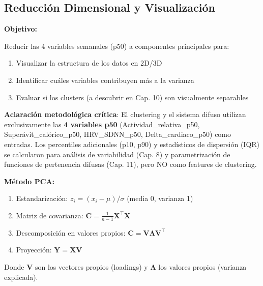 \documentclass[12pt,letterpaper,twoside]{report}
\newcommand{\mat}[1]{\mathbf{#1}}
\begin{document}
\subsection{Reducción Dimensional y Visualización}

\begin{hipotesisbox}
\textbf{Objetivo:}

Reducir las 4 variables semanales (p50) a componentes principales para:
\begin{enumerate}[noitemsep]
    \item Visualizar la estructura de los datos en 2D/3D
    \item Identificar cuáles variables contribuyen más a la varianza
    \item Evaluar si los clusters (a descubrir en Cap. 10) son visualmente separables
\end{enumerate}

\textbf{Aclaración metodológica crítica}: El clustering y el sistema difuso utilizan exclusivamente las \textbf{4 variables p50} (Actividad\_relativa\_p50, Superávit\_calórico\_p50, HRV\_SDNN\_p50, Delta\_cardiaco\_p50) como entradas. Los percentiles adicionales (p10, p90) y estadísticos de dispersión (IQR) se calcularon para análisis de variabilidad (Cap. 8) y parametrización de funciones de pertenencia difusas (Cap. 11), pero NO como features de clustering.
\end{hipotesisbox}

\begin{estadisticobox}
\textbf{Método PCA:}

\begin{enumerate}[noitemsep]
    \item Estandarización: $z_i = (x_i - \mu) / \sigma$ (media 0, varianza 1)
    \item Matriz de covarianza: $\mat{C} = \frac{1}{n-1}\mat{X}^\top\mat{X}$
    \item Descomposición en valores propios: $\mat{C} = \mat{V}\mat{\Lambda}\mat{V}^\top$
    \item Proyección: $\mat{Y} = \mat{X}\mat{V}$
\end{enumerate}

Donde $\mat{V}$ son los vectores propios (loadings) y $\mat{\Lambda}$ los valores propios (varianza explicada).
\end{estadisticobox}
\end{document}
